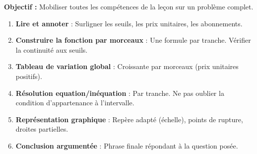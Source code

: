 \documentclass[11pt]{article}
\begin{document}
\begin{methode}
    \textbf{Objectif :} Mobiliser toutes les compétences de la leçon sur un problème complet.
    \begin{enumerate}
        \item \textbf{Lire et annoter} : Surligner les seuils, les prix unitaires, les abonnements.
        \item \textbf{Construire la fonction par morceaux} : Une formule par tranche. Vérifier la continuité aux seuils.
        \item \textbf{Tableau de variation global} : Croissante par morceaux (prix unitaires positifs).
        \item \textbf{Résolution equation/inéquation} : Par tranche. Ne pas oublier la condition d'appartenance à l'intervalle.
        \item \textbf{Représentation graphique} : Repère adapté (échelle), points de rupture, droites partielles.
        \item \textbf{Conclusion argumentée} : Phrase finale répondant à la question posée.
    \end{enumerate}
\end{methode}
\end{document}
